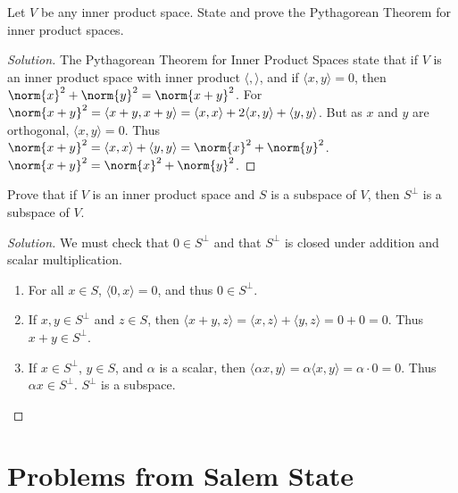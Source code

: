 \documentclass[crop=false,class=book,oneside]{standalone}                      %
\begin{document}
        \begin{problem}
        Let $V$ be any inner product space. State and prove the Pythagorean Theorem for inner product spaces.
        \end{problem}
        \begin{proof}[Solution]
        The Pythagorean Theorem for Inner Product Spaces state that if $V$ is an inner product space with inner product $\langle, \rangle$, and if $\langle x,y\rangle = 0$, then $\norm{x}^2+\norm{y}^2 = \norm{x+y}^2$. For $\norm{x+y}^2 = \langle x+y,x+y\rangle = \langle x,x\rangle + 2\langle x,y\rangle +\langle y,y\rangle$. But as $x$ and $y$ are orthogonal, $\langle x,y \rangle = 0$. Thus $\norm{x+y}^2 = \langle x,x\rangle + \langle y,y\rangle = \norm{x}^2+\norm{y}^2$. $\norm{x+y}^2 =\norm{x}^2+\norm{y}^2$.
        \end{proof}
        \begin{problem}
        Prove that if $V$ is an inner product space and $S$ is a subspace of $V$, then $S^{\perp}$ is a subspace of $V$.
        \end{problem}
        \begin{proof}[Solution]
        We must check that $0\in S^{\perp}$ and that $S^{\perp}$ is closed under addition and scalar multiplication.
        \begin{enumerate}
            \item For all $x\in S$, $\langle 0,x \rangle = 0$, and thus $0\in S^{\perp}$.
            \item If $x,y\in S^{\perp}$ and $z\in S$, then $\langle x+y,z\rangle = \langle x,z\rangle + \langle y,z\rangle = 0+0=0$. Thus $x+y\in S^{\perp}$.
            \item If $x\in S^{\perp}$, $y\in S$, and $\alpha$ is a scalar, then $\langle \alpha x,y \rangle = \alpha \langle x,y \rangle = \alpha \cdot 0 = 0$. Thus $\alpha x \in S^{\perp}$. $S^{\perp}$ is a subspace.
        \end{enumerate}
        \end{proof}
    \section{Problems from Salem State}
\end{document}
